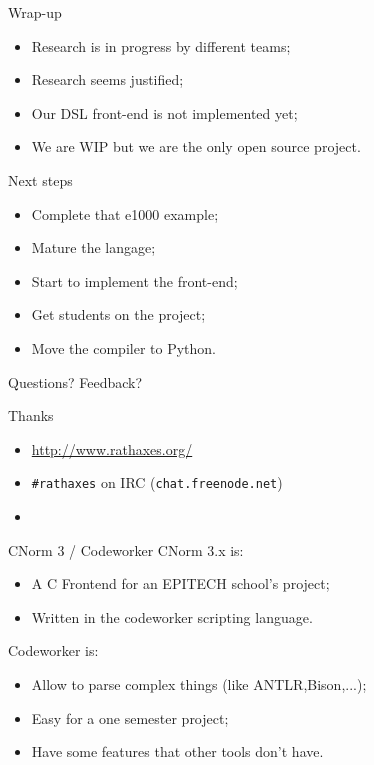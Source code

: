 \documentclass[xcolor={usenames,svgnames}]{beamer}
\begin{document}
\begin{frame}{Wrap-up}
\Large{
\begin{itemize}
\item Research is in progress by different teams;
\item Research seems justified;
\item Our DSL front-end is not implemented yet;
\item We are WIP but we are the only open source project.
\end{itemize}
}
\end{frame}

\begin{frame}{Next steps}
\Large{
\begin{itemize}
\item Complete that e1000 example;
\item Mature the langage;
\item Start to implement the front-end;
\item Get students on the project;
\item Move the compiler to Python.
\end{itemize}
}
\end{frame}

\begin{frame}{Questions? Feedback?}
\begin{center}
\Huge{Thanks}

\end{center}
\vspace{2em}
\begin{itemize}
\item \Large{\url{http://www.rathaxes.org/}}
\item \Large{\texttt{\#rathaxes} on IRC (\texttt{chat.freenode.net})}
\item \Large{\twitter}
\end{itemize}
\end{frame}

\begin{frame}{CNorm 3 / Codeworker}
CNorm 3.x is:
\begin{itemize}
\item A C Frontend for an EPITECH school's project;
\item Written in the codeworker scripting language.
\end{itemize}
Codeworker is:
\begin{itemize}
\item Allow to parse complex things (like ANTLR,Bison,...);
\item Easy for a one semester project;
\item Have some features that other tools don't have.
\end{itemize}
\end{frame}
\end{document}
